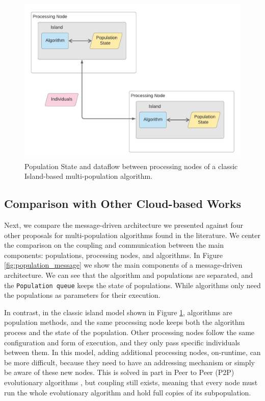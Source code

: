 \documentclass[review]{elsarticle}
\begin{document}
\begin{figure}[ht]
    \centering
    \includegraphics[width=\textwidth]{classicisland}
    \caption{ Population State and dataflow between processing nodes of a classic Island-based multi-population algorithm. }
    \label{fig:classicisland}
\end{figure}

\subsection{Comparison with Other Cloud-based Works} 
\label{comparison}

Next, we compare the message-driven architecture we presented against four other
proposals for multi-population algorithms found in the literature. We center the
comparison on the coupling and communication between the main components:
populations, processing nodes, and algorithms.  In Figure \ref{fig:population_message} we show the
main components of a message-driven architecture. We can see that the algorithm
and populations are separated, and the \texttt{Population queue} keeps the state
of populations. While algorithms only need the populations as parameters
for their execution.


In contrast, in the classic island model shown in Figure
\ref{fig:classicisland}, algorithms are  population methods, and the same processing
node keeps both the algorithm process and the state of the population.  Other
processing nodes follow the same configuration and form of execution, and they
only pass specific individuals between them.  In this model, adding additional
processing nodes, on-runtime, can be more difficult, because they need to have
an addressing mechanism or simply be aware of these new nodes. This is
solved in part in Peer to Peer (P2P) evolutionary algorithms
\cite{juanlu:europar}, but coupling still exists, meaning that every
node must run the whole evolutionary algorithm and hold full copies of
its subpopulation. 
\end{document}

